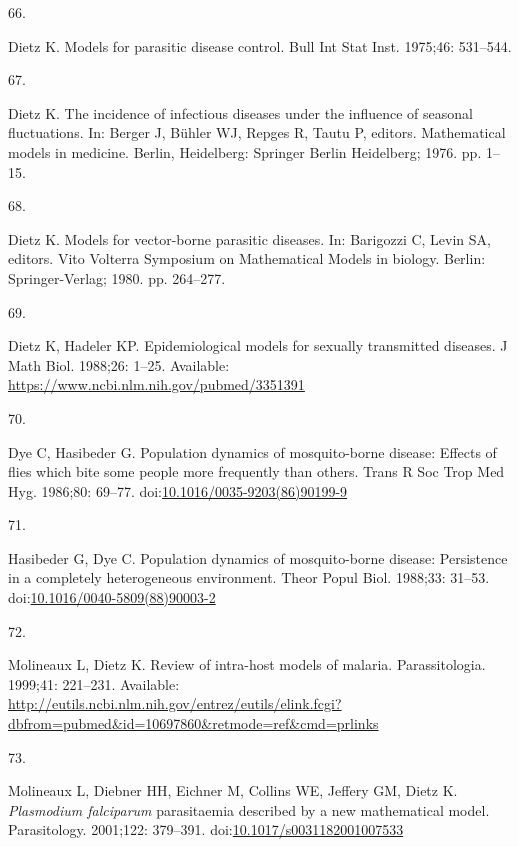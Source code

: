 \documentclass[
]{book}
\newlength{\cslhangindent}
\newlength{\csllabelwidth}
\newenvironment{CSLReferences}[2] %
 {\begin{list}{}{%
  \setlength{\itemindent}{0pt}
  \setlength{\leftmargin}{0pt}
  \setlength{\parsep}{0pt}
  \ifodd #1
   \setlength{\leftmargin}{\cslhangindent}
   \setlength{\itemindent}{-1\cslhangindent}
  \fi
  \setlength{\itemsep}{#2\baselineskip}}}
 {\end{list}}
\newcommand{\CSLLeftMargin}[1]{\parbox[t]{\csllabelwidth}{\strut#1\strut}}
\newcommand{\CSLRightInline}[1]{\parbox[t]{\linewidth - \csllabelwidth}{\strut#1\strut}}
\begin{document}
\begin{CSLReferences}{0}{1}
\CSLLeftMargin{66. }%
\CSLRightInline{Dietz K. Models for parasitic disease control. Bull Int Stat Inst. 1975;46: 531--544. }

\CSLLeftMargin{67. }%
\CSLRightInline{Dietz K. The incidence of infectious diseases under the influence of seasonal fluctuations. In: Berger J, Bühler WJ, Repges R, Tautu P, editors. Mathematical models in medicine. {Berlin, Heidelberg}: {Springer Berlin Heidelberg}; 1976. pp. 1--15. }

\CSLLeftMargin{68. }%
\CSLRightInline{Dietz K. Models for vector-borne parasitic diseases. In: Barigozzi C, Levin SA, editors. Vito {Volterra Symposium} on {Mathematical Models} in biology. {Berlin}: {Springer-Verlag}; 1980. pp. 264--277. }

\CSLLeftMargin{69. }%
\CSLRightInline{Dietz K, Hadeler KP. Epidemiological models for sexually transmitted diseases. J Math Biol. 1988;26: 1--25. Available: \url{https://www.ncbi.nlm.nih.gov/pubmed/3351391}}

\CSLLeftMargin{70. }%
\CSLRightInline{Dye C, Hasibeder G. Population dynamics of mosquito-borne disease: Effects of flies which bite some people more frequently than others. Trans R Soc Trop Med Hyg. 1986;80: 69--77. doi:\href{https://doi.org/10.1016/0035-9203(86)90199-9}{10.1016/0035-9203(86)90199-9}}

\CSLLeftMargin{71. }%
\CSLRightInline{Hasibeder G, Dye C. Population dynamics of mosquito-borne disease: Persistence in a completely heterogeneous environment. Theor Popul Biol. 1988;33: 31--53. doi:\href{https://doi.org/10.1016/0040-5809(88)90003-2}{10.1016/0040-5809(88)90003-2}}

\CSLLeftMargin{72. }%
\CSLRightInline{Molineaux L, Dietz K. Review of intra-host models of malaria. Parassitologia. 1999;41: 221--231. Available: \url{http://eutils.ncbi.nlm.nih.gov/entrez/eutils/elink.fcgi?dbfrom=pubmed&id=10697860&retmode=ref&cmd=prlinks}}

\CSLLeftMargin{73. }%
\CSLRightInline{Molineaux L, Diebner HH, Eichner M, Collins WE, Jeffery GM, Dietz K. \emph{Plasmodium falciparum} parasitaemia described by a new mathematical model. Parasitology. 2001;122: 379--391. doi:\href{https://doi.org/10.1017/s0031182001007533}{10.1017/s0031182001007533}}


\end{CSLReferences}
\end{document}
